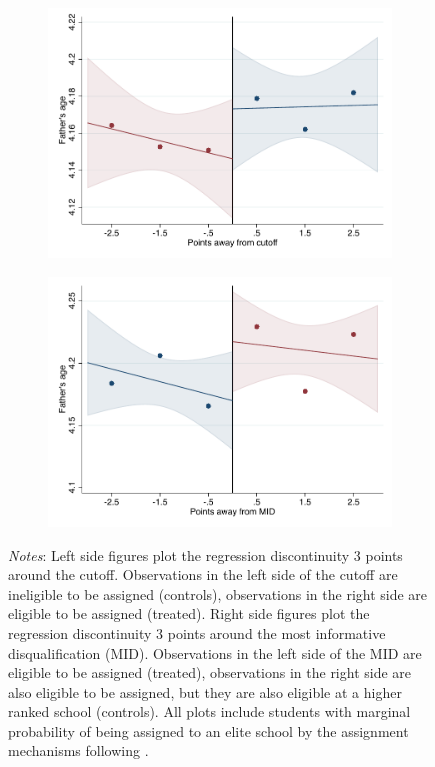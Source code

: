 \documentclass[oneside,11pt]{article}
\begin{document}
\begin{figure}[H]
\begin{center}
    \begin{subfigure}{0.475\textwidth}
        \centering
        \includegraphics[width=\textwidth]{04_Figures/rd_plot_tau_edad_pad_IPN3.pdf}
    \end{subfigure}
    \begin{subfigure}{0.475\textwidth}
        \centering
        \includegraphics[width=\textwidth]{04_Figures/rd_plot_mid_edad_pad_IPN3.pdf}
    \end{subfigure}
    \end{center}
    
\footnotesize
\textit{Notes}: Left side figures plot the regression discontinuity 3 points around the cutoff. Observations in the left side of the cutoff are ineligible to be assigned (controls), observations in the right side are eligible to be assigned (treated). Right side figures plot the regression discontinuity 3 points around the most informative disqualification (MID). Observations in the left side of the MID are eligible to be assigned (treated), observations in the right side are also eligible to be assigned, but they are also eligible at a higher ranked school (controls). All plots include students with marginal probability of being assigned to an elite school by the assignment mechanisms following \citet{abdulkadirouglu2022breaking}. 
\end{figure}
\end{document}
